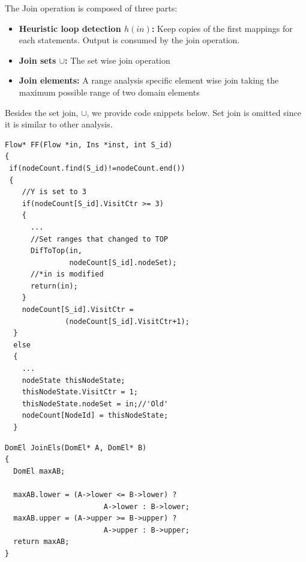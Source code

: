 The Join operation is composed of three parts:
\begin{itemize}
\item{\textbf{Heuristic loop detection $h(in)$: }Keep copies of the first mappings for each statements. Output is consumed by the join operation.}
\item{\textbf{Join sets $\cup$: }The set wise join operation}
\item{\textbf{Join elements: }A range analysis specific element wise join taking the maximum possible range of two domain elements}
\end{itemize}

Besides the set join, $\cup$, we provide code snippets below. Set join is omitted since it is similar to other analysis.\\

 \begin{lstlisting}[caption=Heuristic loop detector $h(in)$, label=PAFF]
Flow* FF(Flow *in, Ins *inst, int S_id) 
{
 if(nodeCount.find(S_id)!=nodeCount.end())
 {
    //Y is set to 3
    if(nodeCount[S_id].VisitCtr >= 3)
    {
      ...
      //Set ranges that changed to TOP
      DifToTop(in, 
               nodeCount[S_id].nodeSet);
      //*in is modified
      return(in);
    }
    nodeCount[S_id].VisitCtr = 
              (nodeCount[S_id].VisitCtr+1);
  }
  else
  {
    ...
    nodeState thisNodeState;
	thisNodeState.VisitCtr = 1;
	thisNodeState.nodeSet = in;//'Old'
	nodeCount[NodeId] = thisNodeState;
  }

 \end{lstlisting}
 
 \begin{lstlisting}[caption=Per domain element join, label=PAFF]
DomEl JoinEls(DomEl* A, DomEl* B)
{
  DomEl maxAB;

  maxAB.lower = (A->lower <= B->lower) ? 
                       A->lower : B->lower;
  maxAB.upper = (A->upper >= B->upper) ? 
                       A->upper : B->upper;
  return maxAB;
}
 \end{lstlisting}